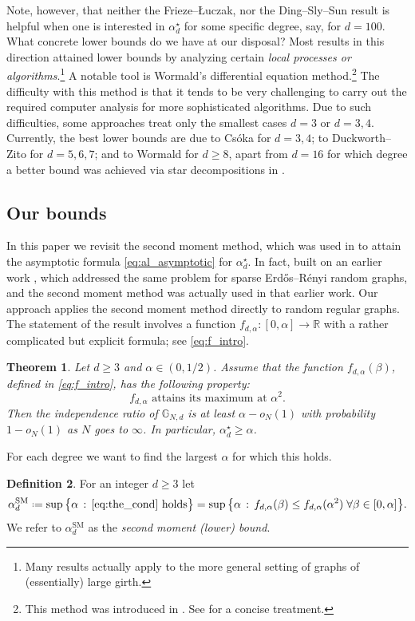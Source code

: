 \documentclass[12pt]{amsart}
\newtheorem{theorem}{Theorem}[section]
\theoremstyle{definition}
\newtheorem{definition}[theorem]{Definition}
\newcommand\Rb{\mathbb{R}}
\newcommand\Gb{\mathbb{G}}
\newcommand\al{\alpha}
\newcommand\be{\beta}
\newcommand\alstar{\alpha^{\star}}
\newcommand\alsm{\alpha^{\mathrm{SM}}}
\newcommand{\defeq}{\mathrel{\vcenter{\baselineskip0.5ex \lineskiplimit0pt
                     \hbox{\scriptsize.}\hbox{\scriptsize.}}}%
                     =}
\begin{document}
Note, however, that neither the Frieze--{\L}uczak, nor the Ding--Sly--Sun result is helpful when one is interested in $\alstar_d$ for some specific degree, say, for $d=100$. What concrete lower bounds do we have at our disposal? Most results in this direction attained lower bounds by analyzing certain \emph{local processes or algorithms}.\footnote{Many results actually apply to the more general setting of graphs of (essentially) large girth.} A notable tool is Wormald's differential equation method.\footnote{This method was introduced in \cite{wormald1995differential}. See \cite{warnke2019wormalds} for a concise treatment.} The difficulty with this method is that it tends to be very challenging to carry out the required computer analysis for more sophisticated algorithms. Due to such difficulties, some approaches treat only the smallest cases $d=3$ or $d=3,4$. Currently, the best lower bounds are due to Csóka \cite{csoka2016independent} for $d=3,4$; to Duckworth--Zito \cite{duckworth2009large} for $d=5,6,7$; and to Wormald \cite{wormald1995differential} for $d \geq 8$, apart from $d=16$ for which degree a better bound was achieved via star decompositions in \cite{delcourt2025decomposing}. 

\subsection{Our bounds}
%
In this paper we revisit the second moment method, which was used in \cite{frieze1992independence} to attain the asymptotic formula \eqref{eq:al_asymptotic} for $\alstar_d$. In fact, \cite{frieze1992independence} built on an earlier work \cite{frieze1990independence}, which addressed the same problem for sparse Erdős--Rényi random graphs, and the second moment method was actually used in that earlier work. Our approach applies the second moment method directly to random regular graphs. The statement of the result involves a function $f_{d,\al} \colon [0,\al] \to \Rb$ with a rather complicated but explicit formula; see \eqref{eq:f_intro}. 
%
\begin{theorem} \label{thm:sm_intro}
Let $d\geq 3$ and $\al \in (0,1/2)$. Assume that the function $f_{d,\al}(\be)$, defined in \eqref{eq:f_intro}, has the following property:
%
\begin{equation} \label{eq:the_cond}
f_{d,\al} %
\text{ attains its maximum at } \al^2 .
\end{equation}
%
Then the independence ratio of $\Gb_{N,d}$ is at least $\al-o_N(1)$ with probability $1-o_N(1)$ as $N$ goes to $\infty$. In particular, $\alstar_d \geq \al$. 
\end{theorem}
%
For each degree we want to find the largest $\al$ for which this holds. 
%
\begin{definition} \label{def:alsm}
For an integer $d \geq 3$ let 
%
\[  \alsm_d \defeq 
\sup \big\{\al \, : \, \text{\eqref{eq:the_cond} holds} \big\}
= \sup \big\{\al \, : \, 
f_{d,\al}(\be) \leq f_{d,\al}(\al^2) 
\;\forall \be \in [0,\al] \big\}  .\]
%
We refer to $\alsm_d$ as the \emph{second moment (lower) bound}.
\end{definition}
%
\end{document}

